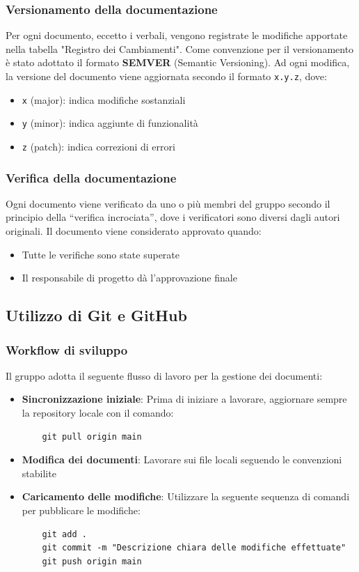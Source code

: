 \documentclass[11pt,a4paper]{article}
\begin{document}
\subsubsection{Versionamento della documentazione}
Per ogni documento, eccetto i verbali, vengono registrate le modifiche apportate nella tabella "Registro dei Cambiamenti". 
Come convenzione per il versionamento è stato adottato il formato \textbf{SEMVER} (Semantic Versioning). Ad ogni modifica, la versione del documento viene aggiornata secondo il formato \texttt{x.y.z}, dove:
\begin{itemize}
    \item \texttt{x} (major): indica modifiche sostanziali
    \item \texttt{y} (minor): indica aggiunte di funzionalità
    \item \texttt{z} (patch): indica correzioni di errori
\end{itemize}

\subsubsection{Verifica della documentazione}
Ogni documento viene verificato da uno o più membri del gruppo secondo il principio della ``verifica incrociata'', dove i verificatori sono diversi dagli autori originali.
Il documento viene considerato approvato quando:
\begin{itemize}
    \item Tutte le verifiche sono state superate
    \item Il responsabile di progetto dà l'approvazione finale
\end{itemize}

\subsection{Utilizzo di Git e GitHub}

\subsubsection{Workflow di sviluppo}
Il gruppo adotta il seguente flusso di lavoro per la gestione dei documenti:
\begin{itemize}
    \item \textbf{Sincronizzazione iniziale}: Prima di iniziare a lavorare, aggiornare sempre la repository locale con il comando:
    \begin{verbatim}
    git pull origin main
    \end{verbatim}
    
    \item \textbf{Modifica dei documenti}: Lavorare sui file locali seguendo le convenzioni stabilite
    
    \item \textbf{Caricamento delle modifiche}: Utilizzare la seguente sequenza di comandi per pubblicare le modifiche:
    \begin{verbatim}
    git add .
    git commit -m "Descrizione chiara delle modifiche effettuate"
    git push origin main
    \end{verbatim}
\end{itemize}
\end{document}
